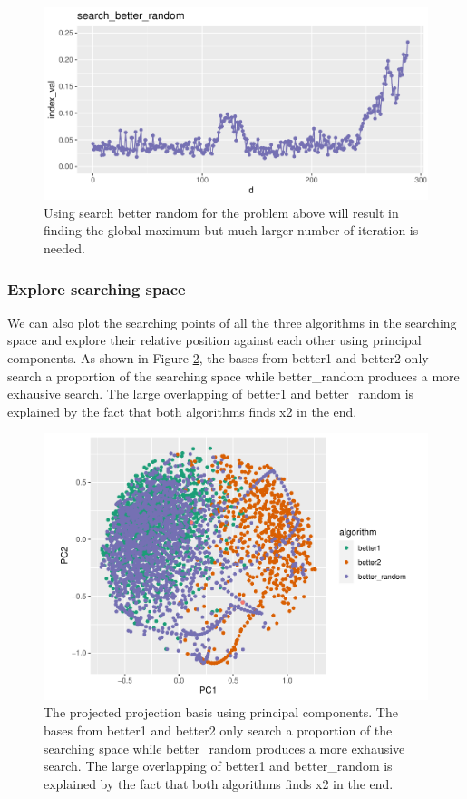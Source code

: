 \documentclass[12pt]{article}
\begin{document}
\begin{figure}
\centering
\includegraphics{paper_files/figure-latex/1d-2var-better-random-1.pdf}
\caption{\label{1d-2var-better-random}Using search better random for the
problem above will result in finding the global maximum but much larger
number of iteration is needed.}
\end{figure}

\hypertarget{explore-searching-space}{%
\subsubsection{Explore searching space}\label{explore-searching-space}}

We can also plot the searching points of all the three algorithms in the
searching space and explore their relative position against each other
using principal components. As shown in Figure
\ref{1d-2var-explore-proj-pca}, the bases from better1 and better2 only
search a proportion of the searching space while better\_random produces
a more exhausive search. The large overlapping of better1 and
better\_random is explained by the fact that both algorithms finds x2 in
the end.

\begin{figure}
\centering
\includegraphics{paper_files/figure-latex/1d-2var-explore-proj-pca-1.pdf}
\caption{\label{1d-2var-explore-proj-pca} The projected projection basis
using principal components. The bases from better1 and better2 only
search a proportion of the searching space while better\_random produces
a more exhausive search. The large overlapping of better1 and
better\_random is explained by the fact that both algorithms finds x2 in
the end.}
\end{figure}
\end{document}
